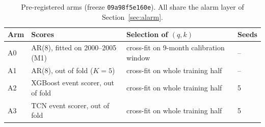 \begin{table}[t]\centering\small
\caption{Pre-registered arms (freeze \texttt{09a98f5e160e}). All share the alarm layer of
Section~\ref{sec:alarm}.}\label{tab:arms}
\begin{tabular}{llll}\toprule
Arm & Scores & Selection of $(q,k)$ & Seeds\\\midrule
A0 & AR(8), fitted on 2000--2005 (M1) & cross-fit on 9-month calibration window & --\\
A1 & AR(8), out of fold ($K=5$) & cross-fit on whole training half & --\\
A2 & XGBoost event scorer, out of fold & cross-fit on whole training half & 5\\
A3 & TCN event scorer, out of fold & cross-fit on whole training half & 5\\
\bottomrule\end{tabular}\end{table}
